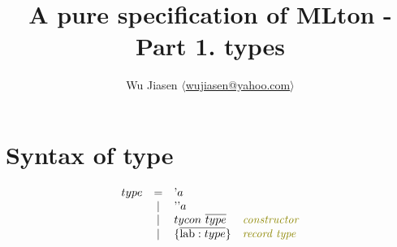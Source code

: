 \documentclass[11pt,a4paper]{article}
\newcommand{\nbkey}[1]{\textrm{#1}}
\newcommand{\lab}{\nbkey{lab}}
\newcommand{\comment}[1]{\textit{\color{olive}#1}}
\newcommand{\braced}[1]{\{#1\}}
\begin{document}
\title {A pure specification of MLton - Part 1. types}
\author{Wu Jiasen $\langle$\href{mailto:wujiasen@yahoo.com}{wujiasen@yahoo.com}$\rangle$}
\maketitle 
\thispagestyle{fancy}

\section{Syntax of type}
\newcommand{\q}     {\textrm{'}}
\newcommand{\Env}   {\textrm{E}}
\newcommand{\vdashT}{\ \vdash_{\textrm{\tiny T}}\  }
\newcommand{\inTE}  {\ \in^{\textrm{\tiny TE}}\  }
\[\begin{array}{lcll}
type & = & \q a                                             & \\
     & | & \q\q a                                           & \\
     & | & tycon\ \overline{type}              	            &\comment{constructor}\\
     & | & \braced{\overline{\lab:type}}       		        &\comment{record type}\\
\end{array}\]
\end{document}
